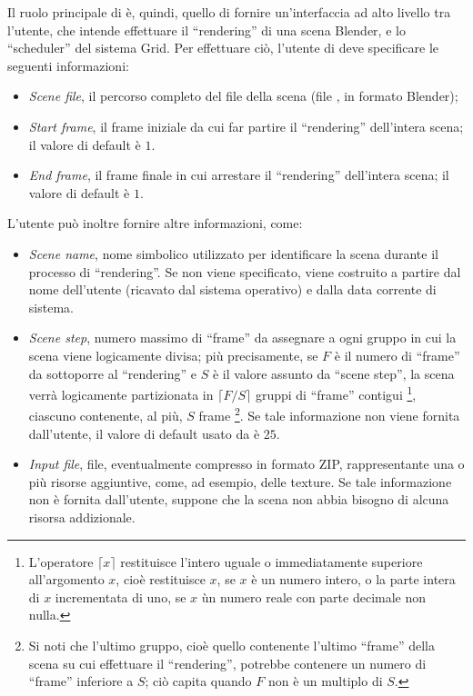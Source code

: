 Il ruolo principale di \mgTheApp{} \`e, quindi, quello di fornire un'interfaccia ad alto livello tra l'utente, che intende effettuare il ``rendering'' di una scena Blender, e lo ``scheduler'' del sistema Grid. Per effettuare ci\`o, l'utente di \mgTheApp{} deve specificare le seguenti informazioni:
\begin{itemize}
\item \emph{Scene file}, il percorso completo del file della scena (file , in formato Blender);
\item \emph{Start frame}, il frame iniziale da cui far partire il ``rendering'' dell'intera scena; il valore di default \`e $1$.
\item \emph{End frame}, il frame finale in cui arrestare il ``rendering'' dell'intera scena; il valore di default \`e $1$.
\end{itemize}
L'utente pu\`o inoltre fornire altre informazioni, come:
\begin{itemize}
\item \emph{Scene name}, nome simbolico utilizzato per identificare la scena durante il processo di ``rendering''.
Se non viene specificato, viene costruito a partire dal nome dell'utente (ricavato dal sistema operativo) e dalla data corrente di sistema.
\item \emph{Scene step}, numero massimo di ``frame'' da assegnare a ogni gruppo in cui la scena viene logicamente divisa; pi\`u precisamente, se $F$ \`e il numero di ``frame'' da sottoporre al ``rendering'' e $S$ \`e il valore assunto da ``scene step'', la scena verr\`a logicamente partizionata in $\lceil F/S \rceil$ gruppi di ``frame'' contigui \footnote{L'operatore $\lceil x \rceil$ restituisce l'intero uguale o immediatamente superiore all'argomento $x$, cio\`e restituisce $x$, se $x$ \`e un numero intero, o la parte intera di $x$ incrementata di uno, se $x$ \`un numero reale con parte decimale non nulla.}, ciascuno contenente, al pi\`u, $S$ frame \footnote{Si noti che l'ultimo gruppo, cio\`e quello contenente l'ultimo ``frame'' della scena su cui effettuare il ``rendering'', potrebbe contenere un numero di ``frame'' inferiore a $S$; ci\`o capita quando $F$ non \`e un multiplo di $S$.}.
Se tale informazione non viene fornita dall'utente, il valore di default usato da \mgTheApp{} \`e $25$.
\item \emph{Input file}, file, eventualmente compresso in formato ZIP, rappresentante una o pi\`u risorse aggiuntive, come, ad esempio, delle texture.
Se tale informazione non \`e fornita dall'utente, \mgTheApp{} suppone che la scena non abbia bisogno di alcuna risorsa addizionale.
\end{itemize}

